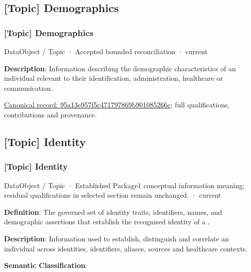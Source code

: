 \subsection{[Topic] Demographics}

\subsubsection{[Topic] Demographics}

\label{element:95a13e957f5c471797869b901085266c}
{\small DataObject / Topic · Accepted bounded reconciliation · current}\par

\textbf{Description}: Information describing the demographic characteristics of an individual relevant to their identification, administration, healthcare or communication.


{\footnotesize \href{../../../../continuum/application/data-object/topic/95a13e957f5c471797869b901085266c.md}{Canonical record: 95a13e957f5c471797869b901085266c}; full qualifications, contributions and provenance.}\par
\subsection{[Topic] Identity}

\subsubsection{[Topic] Identity}

\label{element:3b72456b5686449f95ad26bfbbae07f3}
{\small DataObject / Topic · Established Package1 conceptual information meaning; residual qualifications in selected section remain unchanged. · current}\par

\textbf{Definition}: The governed set of identity traits, identifiers, names, and demographic assertions that establish the recognised identity of a \texttt{}.



\textbf{Description}: Information used to establish, distinguish and correlate an individual across identities, identifiers, aliases, sources and healthcare contexts.



\textbf{Semantic Classification}: \texttt{}



